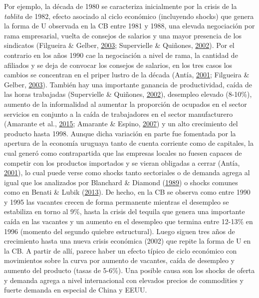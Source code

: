 \documentclass[12pt,oneside]{reedthesis}
\begin{document}
Por ejemplo, la década de 1980 se caracteriza inicialmente por la crisis de la \emph{tablita} de 1982, efecto asociado al ciclo económico (incluyendo shocks) que genera la forma de U observada en la CB entre 1981 y 1988, una elevada negociación por rama empresarial, vuelta de consejos de salarios y una mayor presencia de los sindicatos (Filgueira \& Gelber, \protect\hyperlink{ref-Filgueira2003}{2003}; Supervielle \& Quiñones, \protect\hyperlink{ref-Quinones2001}{2002}). Por el contrario en los años 1990 cae la negociación a nivel de rama, la cantidad de afiliados y se deja de convocar los consejos de salarios, en los tres casos los cambios se concentran en el priper lustro de la década (Antía, \protect\hyperlink{ref-Antia2001}{2001}; Filgueira \& Gelber, \protect\hyperlink{ref-Filgueira2003}{2003}). También hay una importante ganancia de productividad, caída de las horas trabajadas (Supervielle \& Quiñones, \protect\hyperlink{ref-Quinones2001}{2002}), desempleo elevado (8-10\%), aumento de la informalidad al aumentar la proporción de ocupados en el sector servicios en conjunto a la caída de trabajadores en el sector manufacturero (Amarante et al., \protect\hyperlink{ref-Amarante2015}{2015}; Amarante \& Espino, \protect\hyperlink{ref-Amarante2007}{2007}) y un alto crecimiento del producto hasta 1998. Aunque dicha variación en parte fue fomentada por la apertura de la economía uruguaya tanto de cuenta corriente como de capitales, la cual generó como contrapartida que las empresas locales no fuesen capaces de competir con los productos importados y se vieran obligadas a cerrar (Antía, \protect\hyperlink{ref-Antia2001}{2001}), lo cual puede verse como shocks tanto sectoriales o de demanda agrega al igual que los analizados por Blanchard \& Diamond (\protect\hyperlink{ref-Blanchard1989}{1989}) o shocks comunes como en Benati \& Lubik (\protect\hyperlink{ref-Benati2013}{2013}). De hecho, en la CB se observa como entre 1990 y 1995 las vacantes crecen de forma permanente mientras el desempleo se estabiliza en torno al 9\%, hasta la crisis del tequila que genera una importante caída en las vacantes y un aumento en el desempleo que termina entre 12-13\% en 1996 (momento del segundo quiebre estructural). Luego siguen tres años de crecimiento hasta una nueva crisis económica (2002) que repite la forma de U en la CB. A partir de allí, parece haber un efecto típico de ciclo económico con movimientos sobre la curva por aumento de vacantes, caída de desempleo y aumento del producto (tasas de 5-6\%). Una posible causa son los shocks de oferta y demanda agrega a nivel internacional con elevados precios de commodities y fuerte demanda en especial de China y EEUU.
\end{document}
